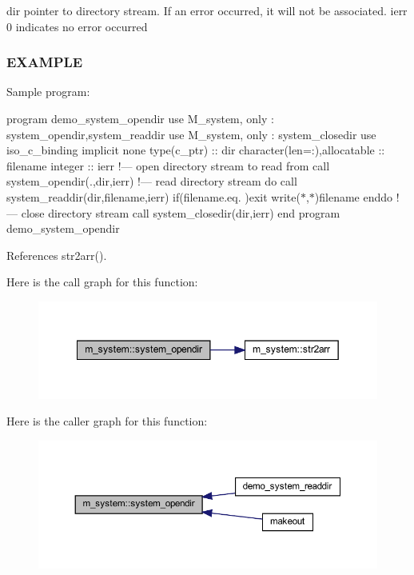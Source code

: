 dir pointer to directory stream. If an error occurred, it will not be associated. ierr 0 indicates no error occurred \subsubsection*{E\+X\+A\+M\+P\+LE}

Sample program\+:

program demo\+\_\+system\+\_\+opendir use M\+\_\+system, only \+: system\+\_\+opendir,system\+\_\+readdir use M\+\_\+system, only \+: system\+\_\+closedir use iso\+\_\+c\+\_\+binding implicit none type(c\+\_\+ptr) \+:\+: dir character(len=\+:),allocatable \+:\+: filename integer \+:\+: ierr !--- open directory stream to read from call system\+\_\+opendir(\textquotesingle{}.\textquotesingle{},dir,ierr) !--- read directory stream do call system\+\_\+readdir(dir,filename,ierr) if(filename.\+eq.\textquotesingle{} \textquotesingle{})exit write($\ast$,$\ast$)filename enddo !--- close directory stream call system\+\_\+closedir(dir,ierr) end program demo\+\_\+system\+\_\+opendir 

References str2arr().

Here is the call graph for this function\+:
\nopagebreak
\begin{figure}[H]
\begin{center}
\leavevmode
\includegraphics[width=349pt]{namespacem__system_a622cc67c03e8cdea1d4c2430bb36081b_cgraph}
\end{center}
\end{figure}
Here is the caller graph for this function\+:
\nopagebreak
\begin{figure}[H]
\begin{center}
\leavevmode
\includegraphics[width=350pt]{namespacem__system_a622cc67c03e8cdea1d4c2430bb36081b_icgraph}
\end{center}
\end{figure}
\mbox{\label{namespacem__system_ae8f39e1d4e420396319105e4e81f92b5}} 
